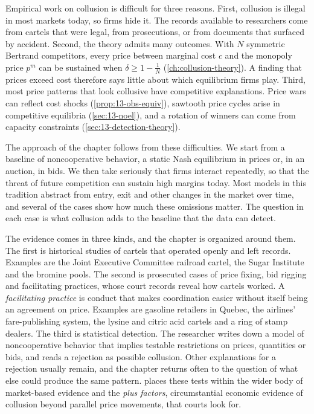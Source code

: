 Empirical work on collusion is difficult for three reasons. First, collusion is illegal in most markets today, so
firms hide it. The records available to researchers come from cartels that were legal, from prosecutions, or from
documents that surfaced by accident. Second, the theory admits many outcomes. With $N$ symmetric Bertrand
competitors, every price between marginal cost $c$ and the monopoly price $p^m$ can be sustained when
$\delta \ge 1 - \frac{1}{N}$ (\cref{ch:collusion-theory}). A finding that prices exceed cost therefore says little
about which equilibrium firms play. Third, most price patterns that look collusive have competitive explanations.
Price wars can reflect cost shocks (\cref{prop:13-obs-equiv}), sawtooth price cycles arise in competitive
equilibria (\cref{sec:13-noel}), and a rotation of winners can come from capacity constraints
(\cref{sec:13-detection-theory}).

The approach of the chapter follows from these difficulties. We start from a baseline of noncooperative behavior,
a static Nash equilibrium in prices or, in an auction, in bids. We then take seriously that firms interact
repeatedly, so that the threat of future competition can sustain high margins today. Most models in this tradition
abstract from entry, exit and other changes in the market over time, and several of the cases show how much these
omissions matter. The question in each case is what collusion adds to the baseline that the data can detect.

The evidence comes in three kinds, and the chapter is organized around them. The first is historical studies of
cartels that operated openly and left records. Examples are the Joint Executive Committee railroad cartel, the
Sugar Institute and the bromine pools. The second is prosecuted cases of price fixing, bid rigging and facilitating
practices, whose court records reveal how cartels worked. A \emph{facilitating practice} is conduct that makes
coordination easier without itself being an agreement on price. Examples are gasoline retailers in Quebec, the airlines'
fare-publishing system, the lysine and citric acid cartels and a ring of stamp dealers. The third is statistical
detection. The researcher writes down a model of noncooperative behavior that implies testable restrictions on
prices, quantities or bids, and reads a rejection as possible collusion. Other explanations for a rejection usually
remain, and the chapter returns often to the question of what else could produce the same pattern.
 places these tests within the wider body of market-based evidence and the
\emph{plus factors}, circumstantial economic evidence of collusion beyond parallel price movements, that courts
look for.

